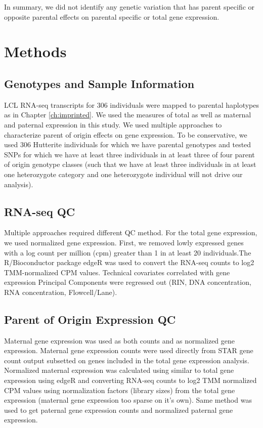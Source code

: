 In summary, we did not identify any genetic variation that has parent specific or opposite parental effects on parental specific or total gene expression.

\section{Methods}\label{ch04-methods}

\subsection{Genotypes and Sample Information}\label{Genotypes and Sample Information}
LCL RNA-seq transcripts for 306 individuals were mapped to parental haplotypes as in Chapter \ref{ch:imprinted}. We used the measures of total as well as maternal and paternal expression in this study. We used multiple approaches to characterize parent of origin effects on gene expression.
To be conservative, we used 306 Hutterite individuals for which we have parental genotypes and tested SNPs for which we have at least three individuals in at least three of four parent of origin genotype classes (such that we have at least three individuals in at least one heterozygote category and one heterozygote individual will not drive our analysis).

\subsection{RNA-seq QC}\label{RNA-seq QC}
Multiple approaches required different QC method. For the total gene expression, we used normalized gene expression. First, we removed lowly expressed genes with a log count per million (cpm) greater than 1 in at least 20 individuals.The R/Bioconductor package edgeR was used to convert the RNA-seq counts to log2 TMM-normalized CPM values\cite{Robinson:2010dd,Robinson:2010cw}. Technical covariates correlated with gene expression Principal Components were regressed out (RIN, DNA concentration, RNA concentration, Flowcell/Lane). 

\subsection{Parent of Origin Expression QC}\label{Parent of Origin Expression QC}
Maternal gene expression was used as both counts and as normalized gene expression. Maternal gene expression counts were used directly from STAR gene count output\cite{Dobin:2002by} subsetted on genes included in the total gene expression analysis. 
Normalized maternal expression was calculated using similar to total gene expression using edgeR and converting RNA-seq counts to log2 TMM normalized CPM values using normalization factors (library sizes) from the total gene expression (maternal gene expression too sparse on it's own). 
Same method was used to get paternal gene expression counts and normalized paternal gene expression.

